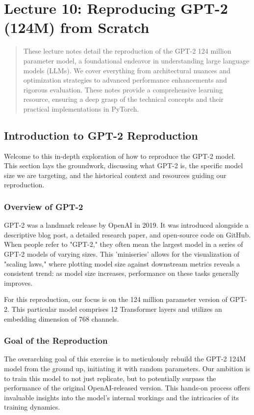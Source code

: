 
\section{Lecture 10: Reproducing GPT-2 (124M) from Scratch}

\begin{abstract}
These lecture notes detail the reproduction of the GPT-2 124 million parameter model, a foundational endeavor in understanding large language models (LLMs). We cover everything from architectural nuances and optimization strategies to advanced performance enhancements and rigorous evaluation. These notes provide a comprehensive learning resource, ensuring a deep grasp of the technical concepts and their practical implementations in PyTorch.
\end{abstract}

\subsection{Introduction to GPT-2 Reproduction}
Welcome to this in-depth exploration of how to reproduce the GPT-2 model. This section lays the groundwork, discussing what GPT-2 is, the specific model size we are targeting, and the historical context and resources guiding our reproduction.

\subsubsection{Overview of GPT-2}
GPT-2 was a landmark release by OpenAI in 2019. It was introduced alongside a descriptive blog post, a detailed research paper, and open-source code on GitHub. When people refer to "GPT-2," they often mean the largest model in a series of GPT-2 models of varying sizes. This 'miniseries' allows for the visualization of "scaling laws," where plotting model size against downstream metrics reveals a consistent trend: as model size increases, performance on these tasks generally improves.

For this reproduction, our focus is on the 124 million parameter version of GPT-2. This particular model comprises 12 Transformer layers and utilizes an embedding dimension of 768 channels.

\subsubsection{Goal of the Reproduction}
The overarching goal of this exercise is to meticulously rebuild the GPT-2 124M model from the ground up, initiating it with random parameters. Our ambition is to train this model to not just replicate, but to potentially surpass the performance of the original OpenAI-released version. This hands-on process offers invaluable insights into the model's internal workings and the intricacies of its training dynamics.

